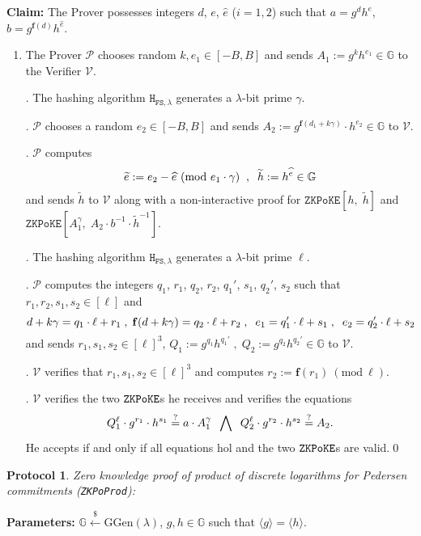 \documentclass[11pt, lettersize, notitlepage, leqno, footskip=0.6cm]{article}
\newcommand{\ttt}{\texttt}
\newcommand{\bG}{\mathbb{G}}
\newcommand{\la}{\langle}
\newcommand{\ra}{\rangle}
\newcommand{\wti}{\widetilde}
\newcommand{\mc}{\mathcal}
\newcommand{\mb}{\mathbb}
\newcommand{\mbf}{\mathbf}
\newcommand{\mr}{\mathrm}
\newcommand{\lam}{\lambda}
\newcommand{\lamb}{\lambda}
\newcommand{\what}{\widehat}
\newcommand{\mP}{\mc{P}}
\newcommand{\V}{\mc{V}}
\newcommand{\vs}{\vspace{-0.15cm}}
\newcommand{\noin}{\noindent}
\newcommand{\sta}{\stackrel{?}{=}}
\newcommand{\Mod}[1]{\ (\mathrm{mod}\ #1)}
\newtheorem{Prot}[Thm]{Protocol}
\numberwithin{equation}{section}
\begin{document}
{{{\noin \textbf{Claim:} The Prover possesses integers $d$, $e$, $\what{e}$ ($i=1,2$) such that $a = g^dh^e$, $b = g^{\mbf{f}(d)}h^{\what{e}}$.

\begin{enumerate}[wide, labelwidth=!, labelindent=0pt]\vs \item The Prover $\mP$ chooses random $k, e_1\in[-B,B]$ and sends $A_1:= g^{k}h^{e_1}\in \bG$ to the Verifier $\V$.

\noin 2. The hashing algorithm $\ttt{H}_{\ttt{FS},\lam}$ generates a $\lam$-bit prime $\gamma$.

\noin 3. $\mP$ chooses a random $e_2 \in [-B,B]$ and sends $A_2:= g^{\mbf{f}(d_1+k\gamma)}\cdot h^{e_2}\in \bG$ to $\V$.

\noin 4. $\mP$ computes \vs $$\wti{e}:= e_2-\what{e}\Mod{e_1\cdot \gamma}\;\;,\;\;\wti{h}:= h^{\what{e}}\in \bG\vs $$ and sends $\wti{h}$ to $\V$ along with a non-interactive proof for $\ttt{ZKPoKE}[h,\; \wti{h}]$ and $\ttt{ZKPoKE}[A_1^{\gamma},\;A_2\cdot b^{-1}\cdot \wti{h}^{-1}] $.

\noin 5. The hashing algorithm $\ttt{H}_{\ttt{FS},\lam}$ generates a $\lam$-bit prime $\ell$. 

\noin 6. $\mP$ computes the integers $q_1$, $r_1$, $q_2$, $r_2$, $q_1'$, $s_1$, $q_2'$, $s_2$ such that $r_1,r_2,s_1,s_2\in [\ell]$ and \vs $$d+k\gamma = q_1\cdot \ell + r_1\;,\; \mbf{f}(d+k\gamma) = q_2\cdot \ell + r_2 \;,\;\;e_1 = q_1'\cdot \ell+s_1 \;,\;\;e_2 = q_2'\cdot \ell+s_2 \vs $$ and sends $r_1 ,s_1, s_2\in [\ell]^3$, $Q_1:= g^{q_1}h^{q_1'}\;,\; Q_2:= g^{q_2}h^{q_2'}\in \bG$ to $\V$.

\noin 7. $\V$ verifies that $r_1 ,s_1, s_2\in [\ell]^3$ and computes $r_2:= \mbf{f}(r_1)\Mod{\ell}$.

\noin 8. $\V$ verifies the two $\tt{ZKPoKE}$s he receives and verifies the equations \vs $$ Q_1^{\ell}\cdot g^{r_1}\cdot h^{s_1}\sta a\cdot A_1^{\gamma} \;\;\bigwedge\;\; Q_2^{\ell}\cdot g^{r_2}\cdot h^{s_2}\sta    A_2 .\vs $$ He accepts if and only if all equations hol and the two $\tt{ZKPoKE}$s are valid.\qed\end{enumerate}


\begin{Prot} \normalfont \hypertarget{PoProdPed}{\textit{Zero knowledge proof of product of discrete logarithms for Pedersen commitments}} (\verb|ZKPoProd|):\end{Prot} \vspace{-0.3cm}

\noin \textbf{Parameters:} $\mb{G}\xleftarrow{\$} \mr{GGen}(\lamb)$,  $g,h\in \mb{G}$ such that $\la g \ra = \la h \ra$.

}}}
\end{document}
